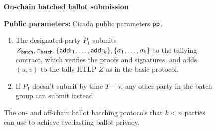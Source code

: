 \begin{figure}
\begin{mdframed}
    \end{mdframed}
    \begin{mdframed}
    \begin{center}
        \textbf{On-chain batched ballot submission}
    \end{center}
    \smallskip
    \textbf{Public parameters:} Cicada public parameters $\mathsf{pp}$.
    \begin{enumerate}
        \item The designated party $P_1$ submits $Z_{\sf batch}, \pi_{\sf batch}, \{{\sf addr}_1, \dots, {\sf addr}_{k}\},\allowbreak \{\sigma_1, \dots, \sigma_{k}\}$ to the tallying contract, which verifies the proofs and signatures, and adds $(u,v)$ to the tally HTLP $Z$ as in the basic protocol.
        \item If $P_1$ doesn't submit by time $T-\tau$, any other party in the batch group can submit instead.
    \end{enumerate}
    \end{mdframed}
    
    \caption{The on- and off-chain ballot batching protocols that $k < n$ parties can use to achieve everlasting ballot privacy.}
    \label{fig:batching_ballots}
\end{figure}